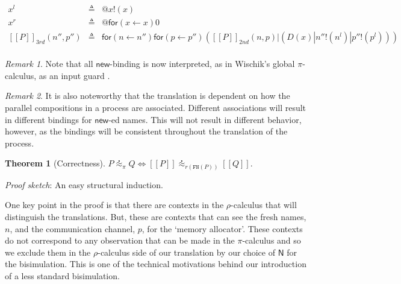 \documentclass[submission,copyright,creativecommons]{eptcs}
\makeatletter
\newcommand{\pic}{$\pi$-calculus}
\newcommand{\ldb}{[\![}
\newcommand{\rdb}{]\!]}
\newcommand{\wbbisim}{\stackrel{\centerdot}{\approx}} %
\newcommand{\pzero}{\mathbin{0}}
\newcommand{\binpar}[2]{#1 | #2}
\newcommand{\outputp}[2]{#1!(#2)}
\newcommand{\prefix}[3]{\mathsf{for}(#2 \leftarrow #1) #3}
\newcommand{\quotep}[1]{\mathsf{@}#1}
\newcommand{\meaningof}[1]{\ldb #1 \rdb}
\newcommand{\rhoc}{$\rho$-calculus}
\theoremstyle{definition}
\newtheorem{theorem}{Theorem}
\theoremstyle{remark}
\newtheorem{remark}{Remark}
\theoremstyle{remark}
\makeatother
\begin{document}
\begin{eqnarray*}
	x^{l} & \triangleq & \quotep{\outputp{x}{x}} \\
	x^{r} & \triangleq & \quotep{\prefix{x}{x}{\pzero}} \\
	\meaningof{P}_{3rd}( n'', p'' ) 
		& \triangleq & 
			\prefix{n''}{n}{\prefix{p''}{p}{(\binpar{\meaningof{P}_{2nd}(  n, p )}
							        {(\binpar{D(x)}{\binpar{\outputp{n''}{n^{l}}}{\outputp{p''}{p^{l}}}})})}} \\
\end{eqnarray*}

\begin{remark}
	Note that all $\mathsf{new}$-binding is now interpreted, as in Wischik's
	global $\pi$-calculus, as an input guard \cite{globalpi}.
\end{remark}
	
\begin{remark}
	It is also noteworthy that the translation is dependent on how
	the parallel compositions in a process are
	associated. Different associations will result in different
	bindings for $\mathsf{new}$-ed names. This will not result in different
	behavior, however, as the bindings will be consistent
	throughout the translation of the process.
\end{remark}

\begin{theorem}[Correctness]	
	$P \wbbisim_{\pi} Q \iff \ldb P \rdb \wbbisim_{r(\texttt{FN}(P))} \ldb Q \rdb$.
\end{theorem}

\emph{Proof sketch}: An easy structural induction.

One key point in the proof is that there are contexts in the {\rhoc}
that will distinguish the translations. But, these are contexts that
can see the fresh names, $n$, and the communication channel, $p$, for
the `memory allocator'. These contexts do not correspond to any
observation that can be made in the {\pic} and so we exclude them in
the {\rhoc} side of our translation by our choice of ${\mathsf N}$
for the bisimulation. This is one of the technical motivations behind
our introduction of a less standard bisimulation.
\end{document}
